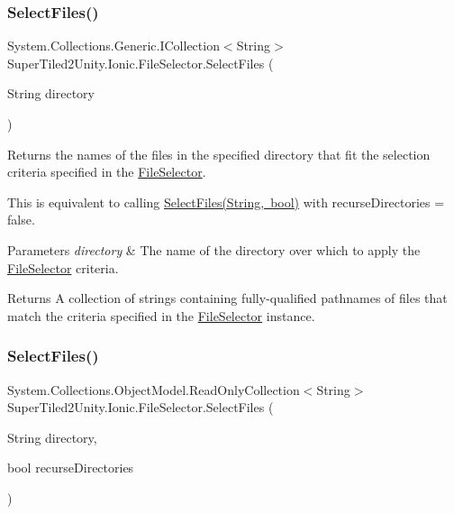 \subsubsection{\texorpdfstring{Select\+Files()}{SelectFiles()}\hspace{0.1cm}{\footnotesize\ttfamily [1/2]}}
{\footnotesize\ttfamily System.\+Collections.\+Generic.\+I\+Collection$<$String$>$ Super\+Tiled2\+Unity.\+Ionic.\+File\+Selector.\+Select\+Files (\begin{DoxyParamCaption}\item[{String}]{directory }\end{DoxyParamCaption})}



Returns the names of the files in the specified directory that fit the selection criteria specified in the \mbox{\hyperlink{class_super_tiled2_unity_1_1_ionic_1_1_file_selector}{File\+Selector}}. 

This is equivalent to calling \mbox{\hyperlink{class_super_tiled2_unity_1_1_ionic_1_1_file_selector_a7678841863d20889f7b0be2737550be3}{Select\+Files(\+String, bool)}} with recurse\+Directories = false. 


\begin{DoxyParams}{Parameters}
{\em directory} & The name of the directory over which to apply the \mbox{\hyperlink{class_super_tiled2_unity_1_1_ionic_1_1_file_selector}{File\+Selector}} criteria. \\
\hline
\end{DoxyParams}


\begin{DoxyReturn}{Returns}
A collection of strings containing fully-\/qualified pathnames of files that match the criteria specified in the \mbox{\hyperlink{class_super_tiled2_unity_1_1_ionic_1_1_file_selector}{File\+Selector}} instance. 
\end{DoxyReturn}
\mbox{\label{class_super_tiled2_unity_1_1_ionic_1_1_file_selector_a7678841863d20889f7b0be2737550be3}} 
\subsubsection{\texorpdfstring{Select\+Files()}{SelectFiles()}\hspace{0.1cm}{\footnotesize\ttfamily [2/2]}}
{\footnotesize\ttfamily System.\+Collections.\+Object\+Model.\+Read\+Only\+Collection$<$String$>$ Super\+Tiled2\+Unity.\+Ionic.\+File\+Selector.\+Select\+Files (\begin{DoxyParamCaption}\item[{String}]{directory,  }\item[{bool}]{recurse\+Directories }\end{DoxyParamCaption})}



